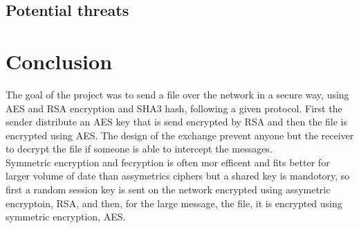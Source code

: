 \documentclass[a4paper,10pt]{article}
\begin{document}
\subsection{Potential threats}

\section{Conclusion}
The goal of the project was to send a file over the network in a secure way, using AES and RSA encryption and SHA3 hash, following a given protocol. First the sender distribute an AES key that is send encrypted by RSA and then the file is encrypted using AES. The design of the exchange prevent anyone but the receiver to decrypt the file if someone is able to intercept the messages.\\
Symmetric encryption and fecryption is often mor efficent and fits better for larger volume of date than assymetrics ciphers but a shared key is mandotory, so first a random session key is sent on the network encrypted using assymetric encryptoin, RSA, and then, for the large message, the file, it is encrypted using symmetric encryption, AES.
\end{document}
